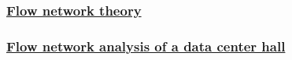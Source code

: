 \documentclass[aspectratio=169,10pt,xcolor={table,dvipsnames},t]{beamer}
\begin{document}
{
\smallframetitle
	\begin{frame}
		\frametitle{\href{https://datahub.berkeley.edu/user-redirect/git-pull?repo=https://github.com/mtsn-lab/me137-237a&subPath=examples/flowNetworkTheory.ipynb}{Flow network theory}}
	\end{frame}
}

{
\smallframetitle
	\begin{frame}
		\frametitle{\href{https://datahub.berkeley.edu/user-redirect/git-pull?repo=https://github.com/mtsn-lab/me137-237a&subPath=examples/flowNetworkCoolingDataHall.ipynb}{Flow network analysis of a data center hall}}
	\end{frame}
}

\end{document}
